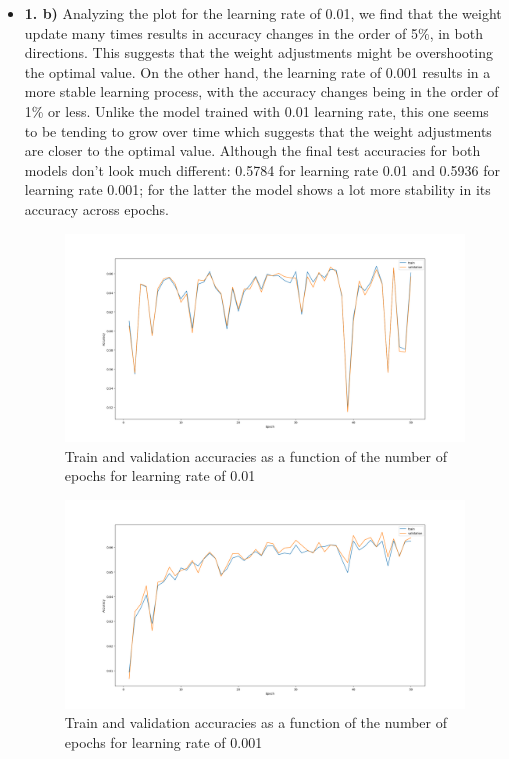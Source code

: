 \documentclass[12pt]{article}
\begin{document}
\begin{itemize}
    \item \textbf{1. b)} Analyzing the plot for the learning rate of 0.01, we find that the weight update many times results in accuracy changes in the order of 5\%, in both directions. This suggests that the weight adjustments might be overshooting the optimal value. On the other hand, the learning rate of 0.001 results in a more stable learning process, with the accuracy changes being in the order of 1\% or less. Unlike the model trained with 0.01 learning rate, this one seems to be tending to grow over time which suggests that the weight adjustments are closer to the optimal value. Although the final test accuracies for both models don't look much different: 0.5784 for learning rate 0.01 and 0.5936 for learning rate 0.001; for the latter the model shows a lot more stability in its accuracy across epochs.
          \begin{figure}[H]
              \centering
              \includegraphics[width=1\linewidth]{../outputs/hw1-q1-1b.01.png}
              \caption{Train and validation accuracies as a function of the number of epochs for learning rate of 0.01}
              \label{fig:1.1b:0.01}
          \end{figure}

          \begin{figure}[H]
              \centering
              \includegraphics[width=1\linewidth]{../outputs/hw1-q1-1b.001.png}
              \caption{Train and validation accuracies as a function of the number of epochs for learning rate of 0.001}
              \label{fig:1.1b:0.001}
          \end{figure}


\end{itemize}
\end{document}

